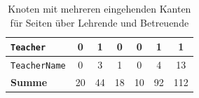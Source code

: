 \begin{table}[htb]
\begin{tabular}{|l|c|c|c|c|c|c|}
            \texttt{Teacher}                               & 0             & 1              & 0               & 0             & 1              & 1             \\ \hline
            \texttt{TeacherName}                           & 0             & 3              & 1               & 0             & 4              & 13            \\ \hline
            \hline
            \textbf{Summe}                        & 20            & 44             & 18              & 10            & 92             & 112           \\ \hline
        \end{tabular}
        \caption{Knoten mit mehreren eingehenden Kanten für Seiten über Lehrende und Betreuende}
        \label{table:findingsTeachersFiguresSharedNodes}
    \end{table}
